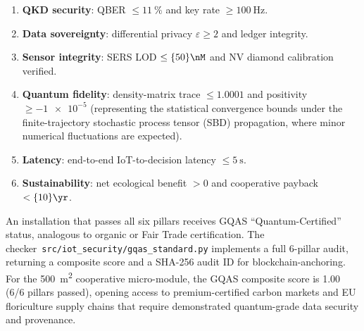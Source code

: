 \documentclass[11pt,a4paper]{article}
\begin{document}
\begin{enumerate}[label=(\roman*)]
\item \textbf{QKD security}: QBER $\leq \qty{11}{\percent}$ and key rate $\geq
\qty{100}{\Hz}$.
\item \textbf{Data sovereignty}: differential privacy $\varepsilon \geq 2$
and ledger integrity.
\item \textbf{Sensor integrity}: SERS LOD $\leq \qty{50}{\nM}$ and NV
diamond calibration verified.
\item \textbf{Quantum fidelity}: density-matrix trace $\leq \num{1.0001}$ and positivity $\geq \num{-1e-5}$ (representing the statistical convergence bounds under the finite-trajectory stochastic process tensor (SBD) propagation, where minor numerical fluctuations are expected).
\item \textbf{Latency}: end-to-end IoT-to-decision latency $\leq
\qty{5}{\s}$.
\item \textbf{Sustainability}: net ecological benefit $> 0$ and
cooperative payback $< \qty{10}{\yr}$.
\end{enumerate}

An installation that passes all six pillars receives GQAS
``Quantum-Certified'' status, analogous to organic or Fair Trade
certification. The checker~\texttt{src/iot\_security/gqas\_standard.py}
implements a full \num{6}-pillar audit, returning a composite score and a
SHA-256 audit ID for blockchain-anchoring. For the
\qty{500}{\m\squared} cooperative micro-module, the GQAS composite score
is \num{1.00} (\num{6}/\num{6} pillars passed), opening access to premium-certified
carbon markets and EU floriculture supply chains that require
demonstrated quantum-grade data security and provenance.





\end{document}
